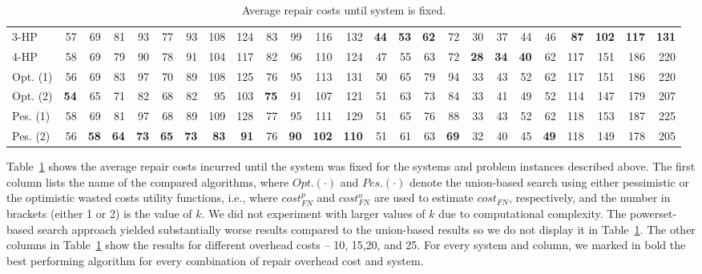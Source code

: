 \begin{table}[htb]
{\begin{tabular}{l|rrrr|rrrr|rrrr|rrrr|rrrr|rrrr}
3-HP     & 57       & 69       & 81       & 93       & 77       & 93       & 108      & 124      & 83       & 99       & 116       & 132       & {\bf 44} & {\bf 53} & {\bf 62} & 72       & 30       & 37       & 44       & 46       & {\bf 87} & {\bf 102} & {\bf 117} & {\bf 131} \\
4-HP     & 58       & 69       & 79       & 90       & 78       & 91       & 104      & 117      & 82       & 96       & 110       & 124       & 47       & 55       & 63       & 72       & {\bf 28} & {\bf 34} & {\bf 40} & 62       & 117      & 151       & 186       & 220       \\
Opt. (1) & 56       & 69       & 83       & 97       & 70       & 89       & 108      & 125      & 76       & 95       & 113       & 131       & 50       & 65       & 79       & 94       & 33       & 43       & 52       & 62       & 117      & 151       & 186       & 220       \\
Opt. (2) & {\bf 54} & 65       & 71       & 82       & 68       & 82       & 95       & 103      & {\bf 75} & 91       & 107       & 121       & 51       & 63       & 73       & 84       & 33       & 41       & 49       & 52       & 114      & 147       & 179       & 207       \\
Pes. (1) & 58       & 69       & 81       & 97       & 68       & 89       & 109      & 128      & 77       & 95       & 111       & 129       & 51       & 65       & 76       & 88       & 33       & 43       & 52       & 62       & 118      & 153       & 187       & 225       \\
Pes. (2) & 56       & {\bf 58} & {\bf 64} & {\bf 73} & {\bf 65} & {\bf 73} & {\bf 83} & {\bf 91} & 76       & {\bf 90} & {\bf 102} & {\bf 110} & 51       & 61       & 63       & {\bf 69} & 32       & 40       & 45       & {\bf 49} & 118      & 149       & 178       & 205      \\ \hline
\end{tabular}
}
\caption{Average repair costs until system is fixed.}
\label{tab:cost-results}
\end{table}



Table~\ref{tab:cost-results} shows the average repair costs incurred until the system was fixed for the systems and problem instances described above.
The first column lists the name of the compared algorithms, where $Opt.(\cdot)$ and $Pes.(\cdot)$ denote the union-based search using either pessimistic or the optimistic wasted costs utility functions, i.e., where
 $cost_{FN}^p$ and $cost_{FN}^o$ are used to estimate $cost_{FN}$, respectively, and the number in brackets (either 1 or 2) is the value of $k$. We did not experiment with larger values of $k$ due to computational complexity. 
The powerset-based search approach yielded substantially worse results compared to the union-based results so we do not display it in Table~\ref{tab:cost-results}.
The other columns in Table~\ref{tab:cost-results} show the results for different overhead costs -- 10, 15,20, and 25. For every system and column, we marked in bold the best performing algorithm for every combination of repair overhead cost and system.

